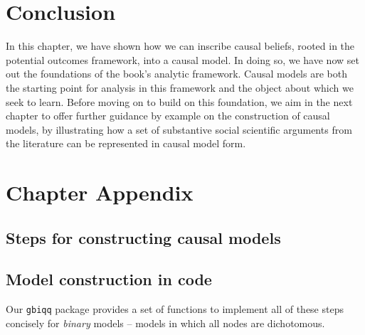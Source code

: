 \documentclass[
  12pt,
]{book}
\begin{document}
\hypertarget{conc2}{%
\section{Conclusion}\label{conc2}}

In this chapter, we have shown how we can inscribe causal beliefs, rooted in the potential outcomes framework, into a causal model. In doing so, we have now set out the foundations of the book's analytic framework. Causal models are both the starting point for analysis in this framework and the object about which we seek to learn. Before moving on to build on this foundation, we aim in the next chapter to offer further guidance by example on the construction of causal models, by illustrating how a set of substantive social scientific arguments from the literature can be represented in causal model form.

\hypertarget{chapter-appendix}{%
\section{Chapter Appendix}\label{chapter-appendix}}

\hypertarget{steps-for-constructing-causal-models}{%
\subsection{Steps for constructing causal models}\label{steps-for-constructing-causal-models}}

\hypertarget{model-construction-in-code}{%
\subsection{Model construction in code}\label{model-construction-in-code}}

Our \texttt{gbiqq} package provides a set of functions to implement all of these steps concisely for \emph{binary} models -- models in which all nodes are dichotomous.
\end{document}
